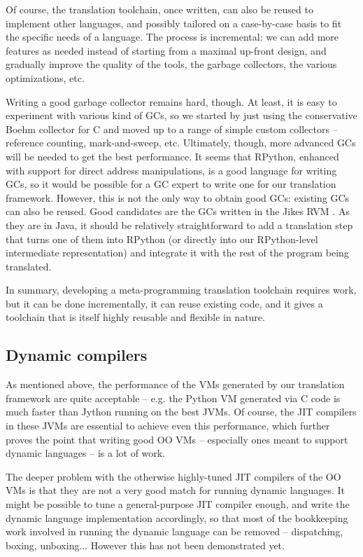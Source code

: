 \documentclass[utf8x]{llncs}
\begin{document}
Of course, the translation toolchain, once written, can also be reused
to implement other languages, and possibly tailored on a case-by-case
basis to fit the specific needs of a language.  The process is
incremental: we can add more features as needed instead of starting from
a maximal up-front design, and gradually improve the quality of the
tools, the garbage collectors, the various optimizations, etc.

Writing a good garbage collector remains hard, though.  At least, it is
easy to experiment with various kind of GCs, so we started by just using
the conservative Boehm \cite{Boehm} collector for C and moved up to a
range of simple custom collectors -- reference counting, mark-and-sweep,
etc.  Ultimately, though, more advanced GCs will be needed to get the
best performance.  It seems that RPython, enhanced with support for
direct address manipulations, is a good language for writing GCs, so it
would be possible for a GC expert to write one for our translation
framework.  However, this is not the only way to obtain good GCs:
existing GCs can also be reused.  Good candidates are the GCs written in
the Jikes RVM \cite{JikesGC}.  As they are in Java, it should be
relatively straightforward to add a translation step that turns one of
them into RPython (or directly into our RPython-level intermediate
representation) and integrate it with the rest of the program being
translated.

In summary, developing a meta-programming translation toolchain requires
work, but it can be done incrementally, it can reuse existing code, and
it gives a toolchain that is itself highly reusable and flexible in
nature.

\subsection{Dynamic compilers}
\label{subsect:dynamic_compilers}

As mentioned above, the performance of the VMs generated by our
translation framework are quite acceptable -- e.g. the Python VM
generated via C code is much faster than Jython running on the best
JVMs.  Of course, the JIT compilers in these JVMs are essential to
achieve even this performance, which further proves the point that
writing good OO VMs -- especially ones meant to support dynamic
languages -- is a lot of work.

The deeper problem with the otherwise highly-tuned JIT compilers of the
OO VMs is that they are not a very good match for running dynamic
languages.  It might be possible to tune a general-purpose JIT compiler
enough, and write the dynamic language implementation accordingly, so
that most of the bookkeeping work involved in running the dynamic
language can be removed -- dispatching, boxing, unboxing...  However
this has not been demonstrated yet.
\end{document}
